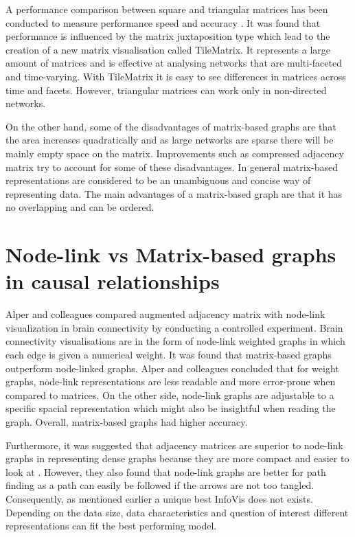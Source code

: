 \documentclass{l4proj}
\begin{document}
A performance comparison between square and triangular matrices has been conducted to measure performance speed and accuracy \cite{liu2015effects}. It was found that performance is influenced by the matrix juxtaposition type which lead to the creation of a new matrix visualisation called TileMatrix. It represents a large amount of matrices and is effective at analysing networks that are multi-faceted and time-varying. With TileMatrix it is easy to see differences in matrices across time and facets. However, triangular matrices can work only in non-directed networks. 

On the other hand, some of the disadvantages of matrix-based graphs are that the area increases quadratically and as large networks are sparse there will be mainly empty space on the matrix. Improvements such as compressed adjacency matrix try to account for some of these disadvantages. In general matrix-based representations are considered to be an unambiguous and concise way of representing data. The main advantages of a matrix-based graph are that it has no overlapping and can be ordered.

\section{Node-link vs Matrix-based graphs in causal relationships}

Alper and colleagues \cite{alper2013weighted} compared augmented adjacency matrix with node-link visualization in brain connectivity by conducting a controlled experiment. Brain connectivity visualisations are in the form of node-link weighted graphs in which each edge is given a numerical weight. It was found that matrix-based graphs outperform node-linked graphs. Alper and colleagues concluded that for weight graphs, node-link representations are less readable and more error-prone when compared to matrices. On the other side, node-link graphs are adjustable to a specific spacial representation which might also be insightful when reading the graph. Overall, matrix-based graphs had higher accuracy.  

Furthermore, it was suggested that adjacency matrices are superior to node-link graphs in representing dense graphs because they are more compact and easier to look at \cite{sheny2007path}. However, they also found that node-link graphs are better for path finding as a path can easily be followed if the arrows are not too tangled. Consequently, as mentioned earlier a unique best InfoVis does not exists. Depending on the data size, data characteristics and question of interest different representations can fit the best performing model. 
\end{document}
